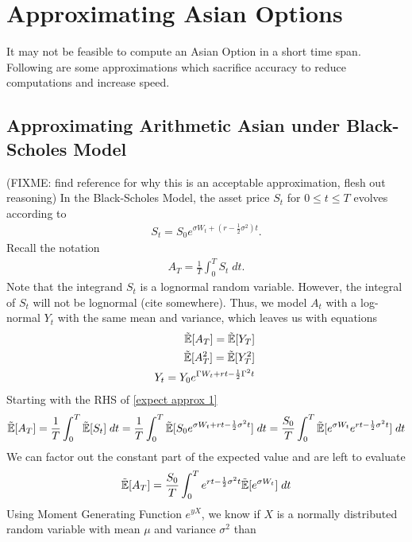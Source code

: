 \documentclass[reqno]{amsart}
\newcommand{\rE}[1]{\tilde{\E}[#1]}
\begin{document}
\section{Approximating Asian Options}
It may not be feasible to compute an Asian Option in a short time span.
Following are some approximations which sacrifice accuracy to reduce computations and increase speed.

\subsection{Approximating Arithmetic Asian under Black-Scholes Model}
(FIXME: find reference for why this is an acceptable approximation, flesh out reasoning)
In the Black-Scholes Model, the asset price $S_t$ for $0\leq t \leq T$ evolves according to
\begin{align} 
     S_t = S_0e^{\sigma W_t+(r - \frac{1}{2} \sigma^2)t}.
\end{align}
Recall the notation
\begin{align}
     A_T = \frac{1}{T}\int_0^T S_t \; dt.
\end{align}
Note that the integrand $S_t$ is a lognormal random variable.
However, the integral of $S_t$ will not be lognormal (cite somewhere).
Thus, we model $A_t$ with a log-normal $Y_t$ with the same mean and variance, which leaves us with equations
\begin{align} \label{expect approx 1}
     \tilde{\mathbb{E}}[A_T] = \tilde{\mathbb{E}}[Y_T] \; \\
     \label{expect approx 2}
     \tilde{\mathbb{E}}[A_T^2] = \tilde{\mathbb{E}}[Y_T^2] \; \\
     Y_t = Y_0e^{\Gamma W_t+rt-\frac{1}{2}\Gamma^2t} \;
\end{align}
Starting with the RHS of \eqref{expect approx 1}
\begin{align} 
     \rE{A_T} 
     = \frac{1}{T} \int_0^T \tilde{\E}[S_t] \; dt 
     = \frac{1}{T} \int_0^T \tilde{\E}[S_0 e^{\sigma W_t+rt-\frac{1}{2}\sigma^2t}] \; dt
     = \frac{S_0}{T} \int_0^T\rE{e^{\sigma W_t}e^{rt-\frac{1}{2}\sigma^2t}} \; dt
\end{align}
We can factor out the constant part of the expected value and are left to evaluate
\begin{align} \label{simplified expected A_T}
     \rE{A_T} = \frac{S_0}{T} \int_0^T e^{rt-\frac{1}{2}\sigma^2t} \rE{e^{\sigma W_t}}  \; dt
\end{align}
Using Moment Generating Function $e^{yX}$, we know if $X$ is a normally distributed random variable with mean $\mu$ and variance $\sigma^2$ than
\end{document}
